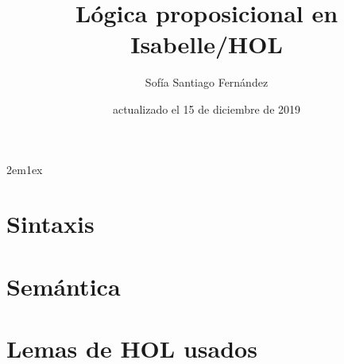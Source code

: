\documentclass[12pt,a4paper,fleqn]{book}
\begin{document}
\title{Lógica proposicional en Isabelle/HOL}
\author{Sofía Santiago Fernández}
\date{actualizado el 15 de diciembre de 2019}
\maketitle


\tableofcontents

\parindent 2em\parskip 1ex

% 

\chapter{Sintaxis}


\chapter{Semántica}


\appendix
\chapter{Lemas de HOL usados}


\nocite{LMF, tutorial,fitting1996first}




\todototoc
\listoftodos
\end{document}
